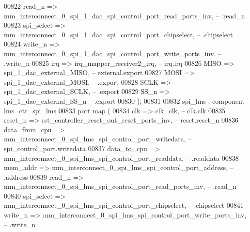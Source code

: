 \begin{DoxyCode}
00822             read\_n        => 
      mm_interconnect_0_spi_1_dac_spi_control_port_read_ports_inv,\textcolor{keyword}{  --                 .read\_n}
00823             spi\_select    => 
      mm_interconnect_0_spi_1_dac_spi_control_port_chipselect,\textcolor{keyword}{      --                 .chipselect}
00824             write\_n       => 
      mm_interconnect_0_spi_1_dac_spi_control_port_write_ports_inv,\textcolor{keyword}{ --                 .write\_n}
00825             irq           => irq_mapper_receiver2_irq,\textcolor{keyword}{                                     --             
       irq.irq}
00826             MISO          => spi_1_dac_external_MISO,\textcolor{keyword}{                                      --        
       external.export}
00827             MOSI          => spi_1_dac_external_MOSI,\textcolor{keyword}{                                      --              
         .export}
00828             SCLK          => spi_1_dac_external_SCLK,\textcolor{keyword}{                                      --              
         .export}
00829             SS\_n          => spi_1_dac_external_SS_n                                       \textcolor{keyword}{--              
         .export}
00830         \textcolor{vhdlchar}{)};
00831 
00832     spi_lms : \textcolor{keywordflow}{component} lms\_ctr\_spi\_lms
00833         \textcolor{keywordflow}{port} \textcolor{keywordflow}{map} (
00834             clk           => clk_clk,\textcolor{keyword}{                                                    --             
       clk.clk}
00835             reset\_n       => rst_controller_reset_out_reset_ports_inv,\textcolor{keyword}{                   --           
       reset.reset\_n}
00836             data\_from\_cpu => 
      mm_interconnect_0_spi_lms_spi_control_port_writedata,\textcolor{keyword}{       -- spi\_control\_port.writedata}
00837             data\_to\_cpu   => mm_interconnect_0_spi_lms_spi_control_port_readdata,\textcolor{keyword}{        --                
       .readdata}
00838             mem\_addr      => mm_interconnect_0_spi_lms_spi_control_port_address,\textcolor{keyword}{         --                
       .address}
00839             read\_n        => 
      mm_interconnect_0_spi_lms_spi_control_port_read_ports_inv,\textcolor{keyword}{  --                 .read\_n}
00840             spi\_select    => 
      mm_interconnect_0_spi_lms_spi_control_port_chipselect,\textcolor{keyword}{      --                 .chipselect}
00841             write\_n       => 
      mm_interconnect_0_spi_lms_spi_control_port_write_ports_inv,\textcolor{keyword}{ --                 .write\_n}

\end{DoxyCode}
